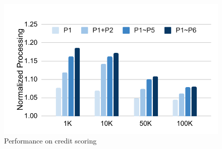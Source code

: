 \begin{figure}[htbp]
\centerline{\includegraphics[scale=0.48]{figures/fg-credit-score.pdf}}
\caption{Performance on credit scoring}\label{fg-credit-score}
\end{figure}